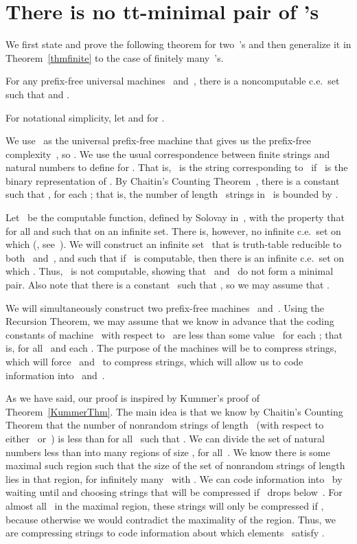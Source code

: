 \documentclass{LMCS}
\newcommand{\0}{\mathbf{0}}
\newcommand{\ce}{c.e.\ }
\newcommand{\<}{\langle}
\renewcommand{\>}{\rangle}
\begin{document}
\section{\texorpdfstring{There is no tt-minimal pair of 's}{There is no tt-minimal pairs of U-random sets}}\label{sec_nominpair}

We first state and prove the following theorem for two~'s and then
generalize it in Theorem~\ref{thmfinite} to the case of finitely
many~'s.

\begin{thm}\label{theorem1}
For any prefix-free universal machines~ and~, there is a
noncomputable \ce set~ such that  and .
\end{thm}

For notational simplicity, let  and  for
.

We use~ as the universal prefix-free machine that gives us the
prefix-free complexity~, so .  We use the
usual correspondence between finite strings and natural numbers to define
 for .  That is,~ is the string corresponding to~
if~ is the binary representation of .
By Chaitin's Counting Theorem~\cite{Chaitin}, there is a constant~ such
that , for each
; that is, the number of length~ strings in~ is bounded
by .

Let~ be the computable function, defined by Solovay in~\cite{Solovay},
with the property that  for all  and such that
 on an infinite set.  There is, however, no infinite \ce set on
which  (\cite{Solovay}, see~\cite[p.~132]{Gacs}).
We will construct an infinite set~ that is truth-table reducible to
both~ and~, and such that if~ is computable, then there is
an infinite \ce set on which .  Thus,~ is not computable,
showing that~ and~ do not form a minimal pair.  Also note that
there is a constant~ such that , so we may assume that
.

We will simultaneously construct two prefix-free machines~ and~.
Using the Recursion Theorem, we may assume that we know in advance that the
coding constants of machine~ with respect to~ are less than some
value~ for each ; that is,  for
all~ and each .
The purpose of the machines will be to compress strings, which will
force~ and~ to compress strings, which will allow us to code
information into~ and~.

As we have said, our proof is inspired by Kummer's proof of
Theorem~\ref{KummerThm}.  The main idea is that we know by Chaitin's Counting
Theorem that the number of nonrandom strings of length~ (with respect to
either~ or~) is less than  for all~ such that
.  We can divide the set
of natural numbers less than
 into  many regions of size , for
all~.  We know there is some maximal such region such that the size of the
set of nonrandom strings of length~ lies in that region, for infinitely
many~ with .
We can code information into~ by waiting until  and
choosing  strings that will be compressed if~ drops
below~.  For almost all~ in the maximal region, these strings will
only be compressed if , because otherwise we would contradict the
maximality of the region.  Thus, we are compressing strings to code
information about which elements~ satisfy .
\end{document}

